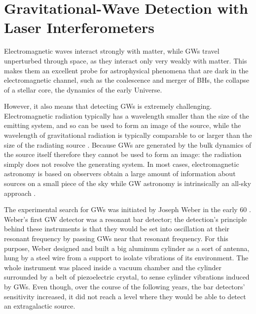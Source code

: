 \documentclass[binding=0.6cm, LaM]{sapthesis}
\begin{document}
\section{Gravitational-Wave Detection with Laser Interferometers}

	Electromagnetic waves interact strongly with matter, while GWs travel unperturbed through space,
        as they interact only very weakly with matter. This makes them an excellent probe for astrophysical phenomena that are dark
        in the electromagnetic channel, such as the coalescence and merger of BHs, the collapse of a stellar core,
  	the dynamics of the early Universe.

	However, it also means that detecting GWs is extremely challenging.
        Electromagnetic radiation typically has a wavelength smaller than the size of the emitting system,
        and so can be used to form an image of the source, while the wavelength of gravitational radiation is typically comparable
        to or larger than the size of the radiating source \cite{18}. 
        Because GWs are generated by the bulk dynamics of the source itself therefore they cannot be used to form an image:
        the radiation simply does not resolve the generating system.
        In most cases, electromagnetic astronomy is based on observers obtain a large amount of information about sources on a small piece
        of the sky while GW astronomy is intrinsically an all-sky approach \cite{4}.

	The experimental search for GWs was initiated by Joseph Weber in the early 60  \cite{7}.
	Weber’s first GW detector was a resonant bar detector; 
	the detection’s principle behind these instruments is that 
	they would be set into oscillation at their resonant frequency 
	by passing GWs near that resonant frequency.
	For this purpose, Weber designed and built a big aluminum cylinder as a sort of antenna, 
	hung by a steel wire from a support to isolate vibrations of its environment. 
	The whole instrument was placed inside a vacuum chamber 
	and the cylinder surrounded by a belt of piezoelectric crystal, 
	to sense cylinder vibrations induced by GWs.
	Even though, over the course of the following years, the bar detectors’ sensitivity increased, 
	it did not reach a level where they would be able to detect an extragalactic source.
\end{document}
